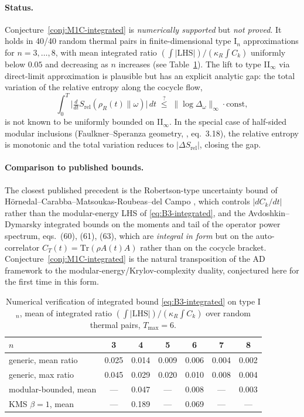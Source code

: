 \paragraph{Status.}  Conjecture~\ref{conj:M1C-integrated} is \emph{numerically supported} but \emph{not proved}.  It holds in 40/40 random thermal pairs in finite-dimensional type I$_n$ approximations for $n = 3, \ldots, 8$, with mean integrated ratio $(\int |\mathrm{LHS}|)/(\kappa_R \int C_k)$ uniformly below $0.05$ and decreasing as $n$ increases (see Table~\ref{tab:M1C-numerics}).  The lift to type II$_\infty$ via direct-limit approximation is plausible but has an explicit analytic gap: the total variation of the relative entropy along the cocycle flow,
\[
  \int_0^T \big|\tfrac{d}{dt} S_{\mathrm{rel}}(\rho_R(t)\|\omega)\big|\, dt
  \;\stackrel{?}{\le}\; \|\log\Delta_\omega\|_\infty \cdot \mathrm{const},
\]
is not known to be uniformly bounded on II$_\infty$.  In the special case of half-sided modular inclusions (Faulkner--Speranza geometry, \cite{FaulknerSperanza2024}, eq.~3.18), the relative entropy is monotonic and the total variation reduces to $|\Delta S_{\mathrm{rel}}|$, closing the gap.

\paragraph{Comparison to published bounds.}  The closest published precedent is the Robertson-type uncertainty bound of Hörnedal--Carabba--Matsoukas-Roubeas--del Campo \cite{Hornedal2022}, which controls $|dC_k/dt|$ rather than the modular-energy LHS of \eqref{eq:B3-integrated}, and the Avdoshkin--Dymarsky integrated bounds on the moments and tail of the operator power spectrum, \cite{AvdoshkinDymarsky2019} eqs.~(60), (61), (63), which are \emph{integral in form} but on the auto-correlator $C_T(t) = \mathrm{Tr}(\rho A(t)A)$ rather than on the cocycle bracket.  Conjecture~\ref{conj:M1C-integrated} is the natural transposition of the AD framework to the modular-energy/Krylov-complexity duality, conjectured here for the first time in this form.

\begin{table}[h]
\centering
\caption{Numerical verification of integrated bound \eqref{eq:B3-integrated} on type I$_n$, mean of integrated ratio $(\int |\mathrm{LHS}|)/(\kappa_R \int C_k)$ over random thermal pairs, $T_{\max} = 6$.}
\label{tab:M1C-numerics}
\begin{tabular}{l|cccccc}
\hline
$n$ & 3 & 4 & 5 & 6 & 7 & 8 \\ \hline
generic, mean ratio & 0.025 & 0.014 & 0.009 & 0.006 & 0.004 & 0.002 \\
generic, max ratio & 0.045 & 0.029 & 0.020 & 0.010 & 0.008 & 0.004 \\
modular-bounded, mean & --- & 0.047 & --- & 0.008 & --- & 0.003 \\
KMS $\beta=1$, mean & --- & 0.189 & --- & 0.069 & --- & --- \\
\hline
\end{tabular}
\end{table}

